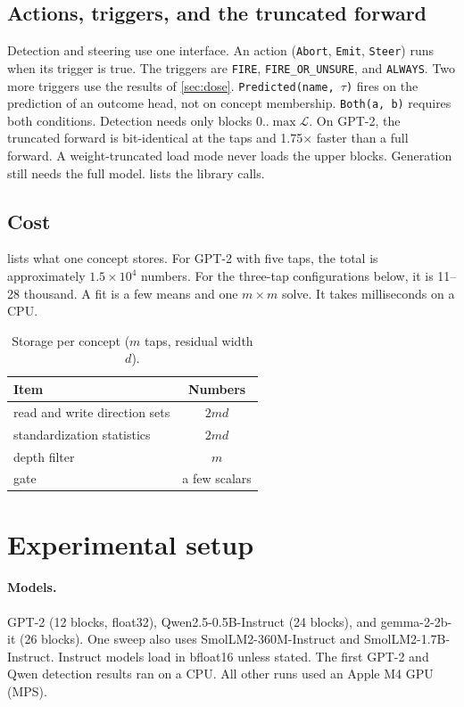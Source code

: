 \documentclass[11pt]{article}
\begin{document}
\subsection{Actions, triggers, and the truncated forward}
Detection and steering use one interface. An action (\texttt{Abort}, \texttt{Emit}, \texttt{Steer}) runs
when its trigger is true. The triggers are \texttt{FIRE}, \texttt{FIRE\_OR\_UNSURE}, and \texttt{ALWAYS}.
Two more triggers use the results of \cref{sec:dose}. \texttt{Predicted(name, $\tau$)} fires on the
prediction of an outcome head, not on concept membership. \texttt{Both(a, b)} requires both conditions.
Detection needs only blocks $0..\max\mathcal{L}$. On GPT-2, the truncated forward is bit-identical at the
taps and 1.75$\times$ faster than a full forward. A weight-truncated load mode never loads the upper
blocks. Generation still needs the full model.  lists the library calls.

\subsection{Cost}
 lists what one concept stores. For GPT-2 with five taps, the total is approximately
$1.5\times10^4$ numbers. For the three-tap configurations below, it is 11--28 thousand. A fit is a few
means and one $m\times m$ solve. It takes milliseconds on a CPU.

\begin{table}[h]
\centering
\small
\caption{Storage per concept ($m$ taps, residual width $d$).}
\label{tab:storage}
\begin{tabular}{lc}
\toprule
Item & Numbers \\
\midrule
read and write direction sets & $2md$ \\
standardization statistics & $2md$ \\
depth filter & $m$ \\
gate & a few scalars \\
\bottomrule
\end{tabular}
\end{table}

\section{Experimental setup}
\label{sec:setup}

\paragraph{Models.} GPT-2 (12 blocks, float32), Qwen2.5-0.5B-Instruct (24 blocks), and gemma-2-2b-it (26
blocks). One sweep also uses SmolLM2-360M-Instruct and SmolLM2-1.7B-Instruct. Instruct models load in
bfloat16 unless stated. The first GPT-2 and Qwen detection results ran on a CPU. All other runs used an
Apple M4 GPU (MPS).
\end{document}
